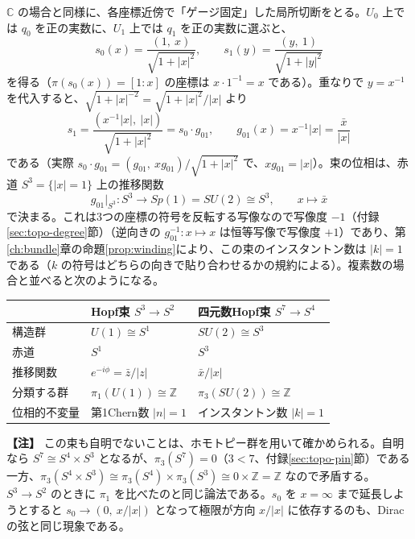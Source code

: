 \documentclass[uplatex, dvipdfmx, book]{jsbook}
\newenvironment{note}{\vspace{1ex}\par\footnotesize\noindent\textbf{【注】}}{\par\vspace{1ex}}
\begin{document}
$\mathbb{C}$ の場合と同様に、各座標近傍で「ゲージ固定」した局所切断をとる。$U_0$ 上では $q_0$ を正の実数に、$U_1$ 上では $q_1$ を正の実数に選ぶと、
\begin{equation}
    s_0(x) = \frac{(1,\ x)}{\sqrt{1 + |x|^2}}, \qquad s_1(y) = \frac{(y,\ 1)}{\sqrt{1 + |y|^2}}
\end{equation}
を得る（$\pi(s_0(x)) = [1 : x]$ の座標は $x \cdot 1^{-1} = x$ である）。重なりで $y = x^{-1}$ を代入すると、$\sqrt{1 + |x|^{-2}} = \sqrt{1 + |x|^2}/|x|$ より
\begin{equation}
    s_1 = \frac{(x^{-1}|x|,\ |x|)}{\sqrt{1 + |x|^2}} = s_0 \cdot g_{01}, \qquad g_{01}(x) = x^{-1}|x| = \frac{\bar{x}}{|x|}
    \label{eq:quaternion-transition}
\end{equation}
である（実際 $s_0 \cdot g_{01} = (g_{01},\ x g_{01})/\sqrt{1 + |x|^2}$ で、$x g_{01} = |x|$）。束の位相は、赤道 $S^3 = \{|x| = 1\}$ 上の推移関数
\begin{equation}
    g_{01}|_{S^3} : S^3 \to Sp(1) = SU(2) \cong S^3, \qquad x \mapsto \bar{x}
\end{equation}
で決まる。これは3つの座標の符号を反転する写像なので写像度 $-1$（付録\ref{sec:topo-degree}節）（逆向きの $g_{01}^{-1}: x \mapsto x$ は恒等写像で写像度 $+1$）であり、第\ref{ch:bundle}章の命題\ref{prop:winding}により、この束のインスタントン数は $|k| = 1$ である（$k$ の符号はどちらの向きで貼り合わせるかの規約による）。複素数の場合と並べると次のようになる。
\begin{center}
\begin{tabular}{lll}
    \hline
    & Hopf束 $S^3 \to S^2$ & 四元数Hopf束 $S^7 \to S^4$ \\
    \hline
    構造群 & $U(1) \cong S^1$ & $SU(2) \cong S^3$ \\
    赤道 & $S^1$ & $S^3$ \\
    推移関数 & $e^{-i\phi} = \bar{z}/|z|$ & $\bar{x}/|x|$ \\
    分類する群 & $\pi_1(U(1)) \cong \mathbb{Z}$ & $\pi_3(SU(2)) \cong \mathbb{Z}$ \\
    位相的不変量 & 第1Chern数 $|n| = 1$ & インスタントン数 $|k| = 1$ \\
    \hline
\end{tabular}
\end{center}

\begin{note}
この束も自明でないことは、ホモトピー群を用いて確かめられる。自明なら $S^7 \cong S^4 \times S^3$ となるが、$\pi_3(S^7) = 0$（$3 < 7$、付録\ref{sec:topo-pin}節）である一方、$\pi_3(S^4 \times S^3) \cong \pi_3(S^4) \times \pi_3(S^3) \cong 0 \times \mathbb{Z} = \mathbb{Z}$ なので矛盾する。$S^3 \to S^2$ のときに $\pi_1$ を比べたのと同じ論法である。$s_0$ を $x = \infty$ まで延長しようとすると $s_0 \to (0,\ x/|x|)$ となって極限が方向 $x/|x|$ に依存するのも、Diracの弦と同じ現象である。
\end{note}
\end{document}
